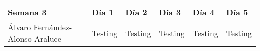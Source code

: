 \begin{table}[h]
	\centering
	\begin{tabular}{| p{2cm} | p{2cm} | p{2cm} | p{2cm} | p{2cm} | p{2cm} |}
		\rowcolor[HTML]{329A9D} 
		{\color[HTML]{FFFFFF} \textbf{Semana 3}} & {\color[HTML]{FFFFFF} \textbf{Día 1}} & {\color[HTML]{FFFFFF} \textbf{Día 2}} & {\color[HTML]{FFFFFF} \textbf{Día 3}} & {\color[HTML]{FFFFFF} \textbf{Día 4}}  & {\color[HTML]{FFFFFF} \textbf{Día 5}} \\ \hline
		Álvaro Fernández-Alonso Araluce & Testing & Testing & Testing & Testing & Testing \\ \hline
	\end{tabular}
\end{table}

